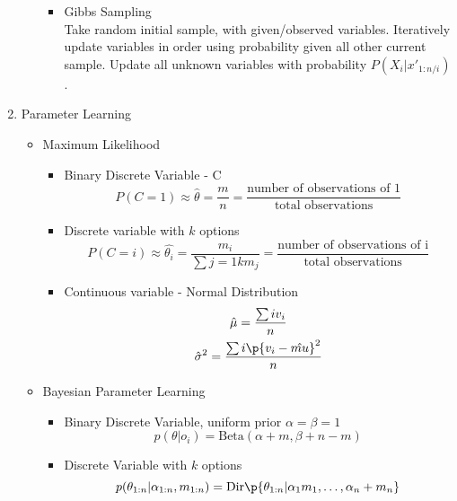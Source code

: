 \documentclass[10pt, oneside]{article}
\begin{document}
\begin{enumerate}
\begin{itemize}
\begin{itemize}
            \item Gibbs Sampling \\
              Take random initial sample, with given/observed variables.
              Iteratively update variables in order using probability given all
              other current sample. Update all unknown variables with
              probability $P(X_i | x'_{1:n/i})$.

          \end{itemize}
      \end{itemize}

    \item Parameter Learning
      \begin{itemize}
        \item Maximum Likelihood
          \begin{itemize}
            \item Binary Discrete Variable - C
              \[
                P(C = 1) \approx \hat{\theta} = \frac{m}{n} = \frac{\text{number of observations of 1}}{\text{total observations}}
              \]

            \item Discrete variable with $k$ options
              \[
                P(C = i) \approx \hat{\theta_i} = \frac{m_i}{\sum{j = 1}{k}{m_j}} = \frac{\text{number of observations of i}}{\text{total observations}}
              \]

            \item Continuous variable - Normal Distribution
              \begin{gather*}
                \hat{\mu} = \frac{\sum{i}{}{v_i}}{n} \\
                \hat{\sigma}^2 = \frac{\sum{i}{}{\p{v_i - \hat{mu}}^2}}{n}
              \end{gather*}
          \end{itemize}

        \item Bayesian Parameter Learning
          \begin{itemize}
            \item Binary Discrete Variable, uniform prior $\alpha = \beta = 1$
              \[
                p(\theta | o_i) = \text{Beta}(\alpha + m, \beta + n - m)
              \]

            \item Discrete Variable with $k$ options
              \[
                p(\theta_{1:n} | \alpha_{1:n}, m_{1:n}) = \text{Dir}\p{\theta_{1:n} | \alpha_1 m_1, \ldots, \alpha_n + m_n}
              \]


\end{itemize}
\end{itemize}
\end{enumerate}
\end{document}
